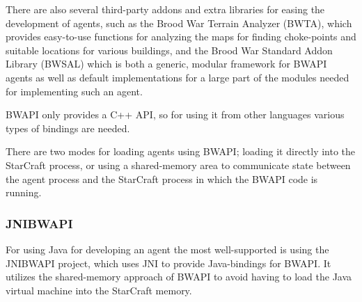 There are also several third-party addons and extra libraries for easing the development of agents, such as the Brood War Terrain Analyzer (BWTA), which provides easy-to-use functions for analyzing the maps for finding choke-points and suitable locations for various buildings,\cite{bwta} and the Brood War Standard Addon Library (BWSAL) which is both a generic, modular framework for BWAPI agents as well as default implementations for a large part of the modules needed for implementing such an agent.\cite{bwsal}

BWAPI only provides a C++ API, so for using it from other languages various types of bindings are needed.

There are two modes for loading agents using BWAPI; loading it directly into the StarCraft process, or using a shared-memory area to communicate state between the agent process and the StarCraft process in which the BWAPI code is running.\cite{bwapi}

\subsubsection{JNIBWAPI}
For using Java for developing an agent the most well-supported is using the JNIBWAPI project, which uses JNI to provide Java-bindings for BWAPI. It utilizes the shared-memory approach of BWAPI to avoid having to load the Java virtual machine into the StarCraft memory.
